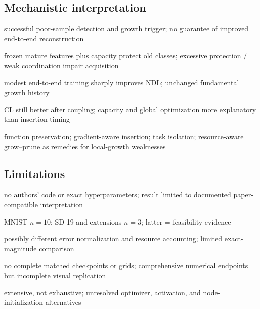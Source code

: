 \subsection{Mechanistic interpretation}
\begin{draftpoints}
  \item {}successful poor-sample detection and growth trigger; no guarantee of improved end-to-end reconstruction
  \item {}frozen mature features plus capacity protect old classes; excessive protection / weak coordination impair acquisition
  \item {}modest end-to-end training sharply improves NDL; unchanged fundamental growth history
  \item {}CL still better after coupling; capacity and global optimization more explanatory than insertion timing
  \item {}function preservation; gradient-aware insertion; task isolation; resource-aware grow--prune as remedies for local-growth weaknesses \parencite{chen2016net2net,evci2022gradmax,maile2022north,rusu2016progressive,dai2018nest}
\end{draftpoints}

\subsection{Limitations}
\begin{draftpoints}
  \item {}no authors' code or exact hyperparameters; result limited to documented paper-compatible interpretation
  \item {}MNIST $n=10$; SD-19 and extensions $n=3$; latter = feasibility evidence
  \item {}possibly different error normalization and resource accounting; limited exact-magnitude comparison
  \item {}no complete matched checkpoints or grids; comprehensive numerical endpoints but incomplete visual replication
  \item {}extensive, not exhaustive; unresolved optimizer, activation, and node-initialization alternatives
\end{draftpoints}

